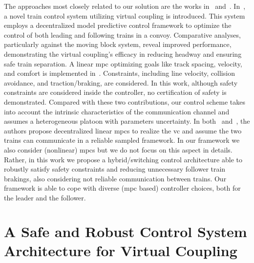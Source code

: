 The approaches most closely related to our solution are the works in~\cite{felez2019model} and~\cite{wu2021virtually}. In~\cite{felez2019model}, a novel train control system utilizing virtual coupling is introduced. This system employs a decentralized model predictive control framework to optimize the control of both leading and following trains in a convoy. Comparative analyses, particularly against the moving block system, reveal improved performance, demonstrating the virtual coupling's efficacy in reducing headway and ensuring safe train separation. A linear \gls{mpc} optimizing goals like track spacing, velocity, and comfort is implemented in~\cite{wu2021virtually}. Constraints, including line velocity, collision avoidance, and traction/braking, are considered. In this work, although  safety constraints are considered inside the controller, no certification of safety is demonstrated. Compared with these two contributions, our control scheme takes into account the intrinsic characteristics of the communication channel and assumes a heterogeneous platoon with parameters uncertainty. In both~\cite{felez2019model} and~\cite{wu2021virtually}, the authors propose decentralized linear \glspl{mpc} to realize the \gls{vc} and assume the two trains can communicate in a reliable sampled framework.
In our framework we also consider (nonlinear) \glspl{mpc} but we do not focus on this aspect in details. 
Rather, in this work we propose a hybrid/switching control architecture able to robustly satisfy safety constraints and reducing unnecessary follower train brakings, also considering not reliable communication between trains. Our framework is able to cope with diverse (\gls{mpc} based) controller choices, both for the leader and the follower. 




\chapter{A Safe and Robust Control System Architecture for Virtual Coupling}
\label{Chapter:5}

